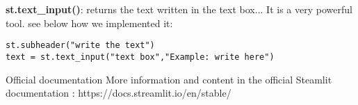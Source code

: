 \documentclass{beamer}[10pt, usepdftitle=false handout]
\begin{document}
\begin{frame}[fragile]
\textbf{st.text\_input()}: returns the text written in the text box... It is a very powerful tool. see below how we implemented it:
\vspace*{0.6em}

\begin{verbatim}
st.subheader("write the text")
text = st.text_input("text box","Example: write here")
\end{verbatim}

\begin{block}{Official documentation}
More information and content in the official Steamlit documentation :
https://docs.streamlit.io/en/stable/
\end{block}
\end{frame}
\end{document}
